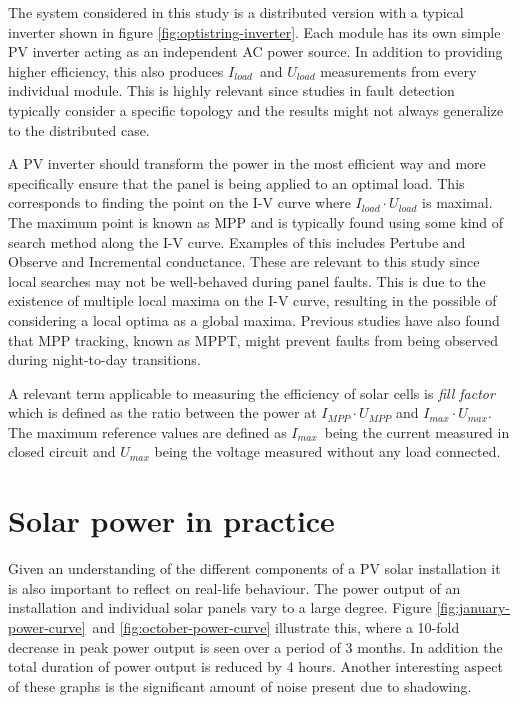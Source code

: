 The system considered in this study is a distributed version with a typical inverter shown in figure \ref{fig:optistring-inverter}.
Each module has its own simple PV inverter acting as an independent AC power source.
In addition to providing higher efficiency, this also produces $I_{load}$ and $U_{load}$ measurements from every individual module.
This is highly relevant since studies in fault detection typically consider a specific topology and the results might not always generalize to the distributed case.

A PV inverter should transform the power in the most efficient way and more specifically ensure that the panel is being applied to an optimal load.
This corresponds to finding the point on the I-V curve where $I_{load} \cdot U_{load}$ is maximal.
The maximum point is known as MPP and is typically found using some kind of search method along the I-V curve.
Examples of this includes Pertube and Observe and Incremental conductance\cite{Roman2006}.
These are relevant to this study since local searches may not be well-behaved during panel faults\cite{Roman2006}.
This is due to the existence of multiple local maxima on the I-V curve, resulting in the possible of considering a local optima as a global maxima.
Previous studies have also found that MPP tracking, known as MPPT, might prevent faults from being observed during night-to-day transitions\cite{Zhao2010night}.

A relevant term applicable to measuring the efficiency of solar cells is \emph{fill factor} which is defined as the ratio between the power at $I_{MPP} \cdot U_{MPP}$ and $I_{max} \cdot U_{max}$.
The maximum reference values are defined as $I_{max}$ being the current measured in closed circuit and $U_{max}$ being the voltage measured without any load connected.


\section{Solar power in practice}
Given an understanding of the different components of a PV solar installation it is also important to reflect on real-life behaviour.
The power output of an installation and individual solar panels vary to a large degree.
Figure \ref{fig:january-power-curve} and \ref{fig:october-power-curve} illustrate this, where a 10-fold decrease in peak power output is seen over a period of 3 months.
In addition the total duration of power output is reduced by 4 hours.
Another interesting aspect of these graphs is the significant amount of noise present due to shadowing.

